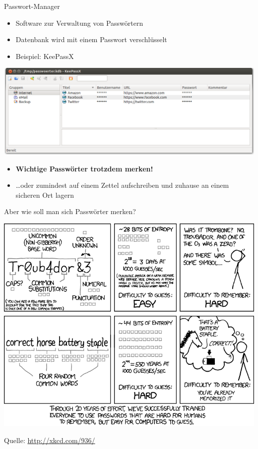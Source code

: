     \begin{frame}{Passwort-Manager}
      \begin{itemize}
        \item Software zur Verwaltung von Passwörtern
        \item Datenbank wird mit einem Passwort verschlüsselt
        \item Beispiel: KeePassX
      \end{itemize}
        \includegraphics[width=\textwidth]{images/keepassx.png}
      \begin{itemize}
        \item \textbf{Wichtige Passwörter trotzdem merken!}
        \item \ldots oder zumindest auf einem Zettel aufschreiben und zuhause an einem sicheren Ort lagern
      \end{itemize}
    \end{frame}
    \begin{frame}{Aber wie soll man sich Passwörter merken?}
      \begin{center}
        \includegraphics[width=0.9\textheight]{images/password_strength.png}\\
      \end{center}
      \tiny Quelle: \url{http://xkcd.com/936/}
    \end{frame}
